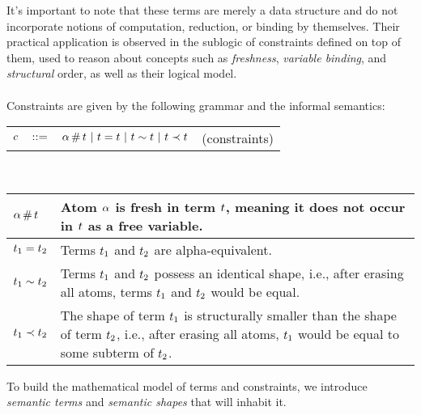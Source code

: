 \documentclass[english, mgr]{iithesis}
\renewcommand{\it}[1]{\textit{#1}}
\begin{document}
It's important to note that these terms are merely a data structure
and do not incorporate notions of computation, reduction, or binding by themselves.
Their practical application is observed in the sublogic of constraints defined on top of them,
used to reason about concepts such as \it{freshness}, \it{variable binding}, and \it{structural} order, as well as their logical model.
\\
\\
Constraints are given by the following grammar and the informal semantics:
\\
\begin{tabular}{rclr}
    $c$  & $::=$ & $\alpha \,\#\, t
                   \ |\  t = t
                   \ |\  t \sim t
                   \ |\  t \prec t$
        & (constraints)
\end{tabular}
\\
\begin{tabularx}{\linewidth}{|l|X|}
  \hline
  $\alpha \,\#\, t$ & Atom $\alpha$ is fresh in term $t$, meaning it does not occur in $t$ as a free variable. \\
  \hline
  $t_1 = t_2$ & Terms $t_1$ and $t_2$ are alpha-equivalent. \\
  \hline
  $t_1 \sim t_2$ & Terms $t_1$ and $t_2$ possess an identical shape, i.e., after erasing all atoms, terms $t_1$ and $t_2$ would be equal. \\
  \hline
  $t_1 \prec t_2$ & The shape of term $t_1$ is structurally smaller than the shape of term $t_2$, i.e., after erasing all atoms, $t_1$ would be equal to some subterm of $t_2$. \\
  \hline
\end{tabularx}

To build the mathematical model of terms and constraints,
we introduce \it{semantic terms} and \it{semantic shapes} that will inhabit it.
\end{document}
